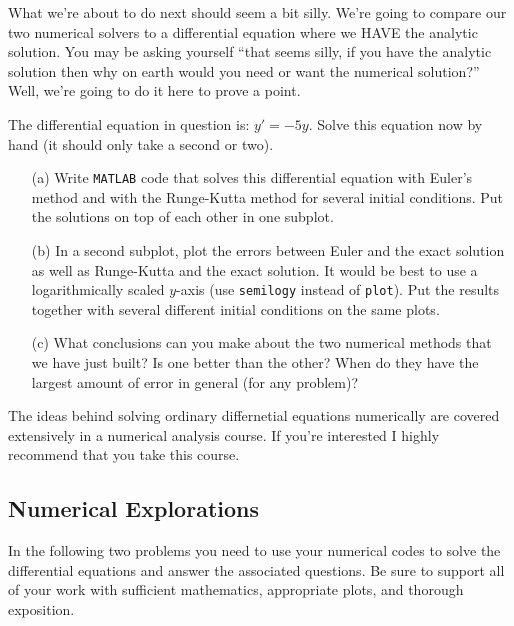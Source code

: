 What we're about to do next should seem a bit silly.  We're going to compare our two
numerical solvers to a differential equation where we HAVE the analytic solution.  You may
be asking yourself ``that seems silly, if you have the analytic solution then why on earth
would you need or want the numerical solution?''  Well, we're going to do it here to prove
a point.  

\begin{problem}
The differential equation in question is: $y' = -5y$.  Solve this equation now by hand (it
should only take a second or two).
\begin{enumerate}
    \item[(a)] Write \texttt{MATLAB} code that solves this differential equation with Euler's
        method and with the Runge-Kutta method for several initial conditions.  Put the
        solutions on top of each other in one subplot.
    \item[(b)] In a second subplot, plot the errors between Euler and the exact solution as
        well as Runge-Kutta and the exact solution.  It would be best to use a
        logarithmically scaled $y$-axis (use \texttt{semilogy} instead of \texttt{plot}).
        Put the results together with several different initial conditions on the same
        plots.
    \item[(c)] What conclusions can you make about the two numerical methods that we have just
        built?  Is one better than the other?  When do they have the largest amount of
        error in general (for any problem)?
\end{enumerate}
\end{problem}

The ideas behind solving ordinary differnetial equations numerically are covered
extensively in a numerical analysis course.  If you're interested I highly recommend that
you take this course.


\subsection{Numerical Explorations}
In the following two problems you need to use your numerical codes to solve the
differential equations and answer the associated questions.  Be sure to support all of
your work with sufficient mathematics, appropriate plots, and thorough exposition.

